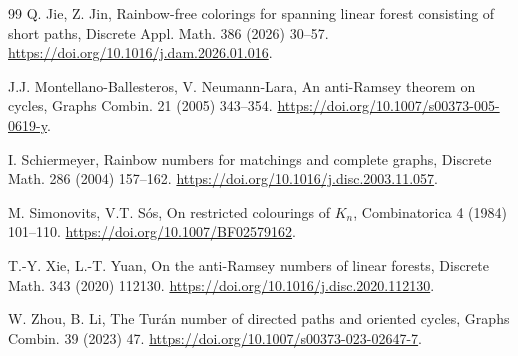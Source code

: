 \documentclass[12pt]{article}
\begin{document}
\begin{thebibliography}{99}
Q. Jie, Z. Jin,
Rainbow-free colorings for spanning linear forest consisting of short paths,
Discrete Appl. Math. 386 (2026) 30--57.
\url{https://doi.org/10.1016/j.dam.2026.01.016}.

J.J. Montellano-Ballesteros, V. Neumann-Lara,
An anti-Ramsey theorem on cycles,
Graphs Combin. 21 (2005) 343--354.
\url{https://doi.org/10.1007/s00373-005-0619-y}.

I. Schiermeyer,
Rainbow numbers for matchings and complete graphs,
Discrete Math. 286 (2004) 157--162.
\url{https://doi.org/10.1016/j.disc.2003.11.057}.

M. Simonovits, V.T. S\'os,
On restricted colourings of $K_n$,
Combinatorica 4 (1984) 101--110.
\url{https://doi.org/10.1007/BF02579162}.

T.-Y. Xie, L.-T. Yuan,
On the anti-Ramsey numbers of linear forests,
Discrete Math. 343 (2020) 112130.
\url{https://doi.org/10.1016/j.disc.2020.112130}.

W. Zhou, B. Li,
The Tur\'an number of directed paths and oriented cycles,
Graphs Combin. 39 (2023) 47.
\url{https://doi.org/10.1007/s00373-023-02647-7}.

\end{thebibliography}
\end{document}
